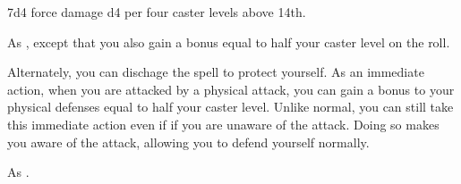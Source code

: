 \begin{spellheader}
    \begin{spelltargetinginfo}
    \end{spelltargetinginfo}
\end{spellheader}
\begin{spellcontent}
    \begin{spelleffects}
        \spelleffect 7d4 force damage \add d4 per four caster levels above 14th.
    \end{spelleffects}
\end{spellcontent}
\begin{spellfooter}

\end{spellfooter}

\begin{spellheader}
    \begin{spelltargetinginfo}
    \end{spelltargetinginfo}
\end{spellheader}
\begin{spellcontent}
    \begin{spelleffects}
        \spelleffect As , except that you also gain a bonus equal to half your caster level on the roll.

        Alternately, you can dischage the spell to protect yourself. As an immediate action, when you are attacked by a physical attack, you can gain a bonus to your physical defenses equal to half your caster level. Unlike normal, you can still take this immediate action even if if you are unaware of the attack. Doing so makes you aware of the attack, allowing you to defend yourself normally.
    \end{spelleffects}
\end{spellcontent}
\begin{spellfooter}
    \spellnotes As .
\end{spellfooter}

